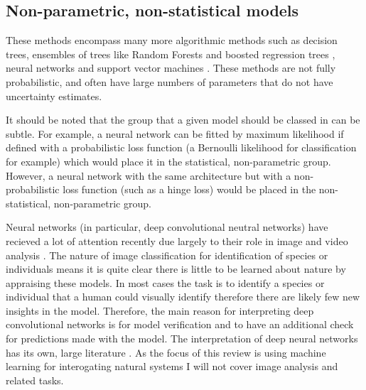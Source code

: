\documentclass[10pt,]{article}
\begin{document}
\begin{figure*}[t]
{\begin{minipage}{1\textwidth}
\subsection{Non-parametric, non-statistical models}
These methods encompass many more algorithmic methods \citep{crisci2012review} such as decision trees, ensembles of trees like Random Forests \citep{breiman2001random} and boosted regression trees \citep{elith2008working, friedman2001greedy}, neural networks \citep{neuralnets} and support vector machines \citep{svm}.
These methods are not fully probabilistic, and often have large numbers of parameters that do not have uncertainty estimates.

It should be noted that the group that a given model should be classed in can be subtle.
For example, a neural network can be fitted by maximum likelihood if defined with a probabilistic loss function (a Bernoulli likelihood for classification for example) which would place it in the statistical, non-parametric group.
However, a neural network with the same architecture but with a non-probabilistic loss function (such as a hinge loss) would be placed in the non-statistical, non-parametric group.

\end{minipage}

}
\normalcolor
\end{figure*}



Neural networks (in particular, deep convolutional neutral networks) have recieved a lot of attention recently due largely to their role in image and video analysis \citep{waldchen2018machine}.
The nature of image classification for identification of species or individuals means it is quite clear there is little to be learned about nature by appraising these models.
In most cases the task is to identify a species or individual that a human could visually identify \citep{waldchen2018machine, mac2018bat} therefore there are likely few new insights in the model.
Therefore, the main reason for interpreting deep convolutional networks is for model verification and to have an additional check for predictions made with the model.
The interpretation of deep neural networks has its own, large literature \citep{samek2017explainable, montavon2017methods}.
As the focus of this review is using machine learning for interogating natural systems I will not cover image analysis and related tasks.
\end{document}
